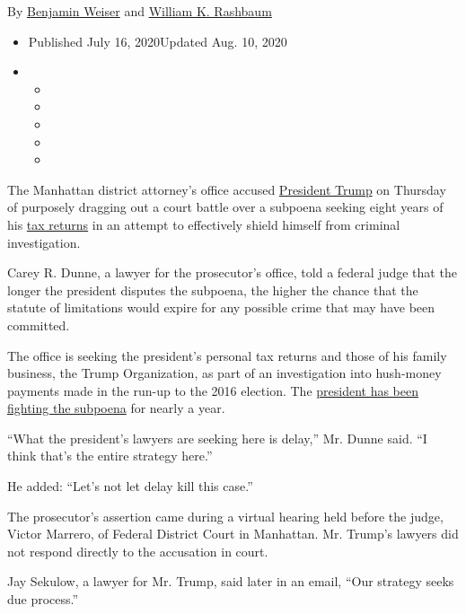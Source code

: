 By \href{https://www.nytimes3xbfgragh.onion/by/benjamin-weiser}{Benjamin
Weiser} and
\href{https://www.nytimes3xbfgragh.onion/by/william-k-rashbaum}{William
K. Rashbaum}

\begin{itemize}
\item
  Published July 16, 2020Updated Aug. 10, 2020
\item
  \begin{itemize}
  \item
  \item
  \item
  \item
  \item
  \end{itemize}
\end{itemize}

The Manhattan district attorney's office accused
\href{https://www.nytimes3xbfgragh.onion/2020/08/05/nyregion/trump-taxes-vance-deutsche-bank.html}{President
Trump} on Thursday of purposely dragging out a court battle over a
subpoena seeking eight years of his
\href{https://www.nytimes3xbfgragh.onion/2020/08/20/nyregion/donald-trump-taxes-cyrus-vance.html}{tax
returns} in an attempt to effectively shield himself from criminal
investigation.

Carey R. Dunne, a lawyer for the prosecutor's office, told a federal
judge that the longer the president disputes the subpoena, the higher
the chance that the statute of limitations would expire for any possible
crime that may have been committed.

The office is seeking the president's personal tax returns and those of
his family business, the Trump Organization, as part of an investigation
into hush-money payments made in the run-up to the 2016 election. The
\href{https://www.nytimes3xbfgragh.onion/2020/07/09/us/politics/trump-taxes.html}{president
has been fighting the subpoena} for nearly a year.

``What the president's lawyers are seeking here is delay,'' Mr. Dunne
said. ``I think that's the entire strategy here.''

He added: ``Let's not let delay kill this case.''

The prosecutor's assertion came during a virtual hearing held before the
judge, Victor Marrero, of Federal District Court in Manhattan. Mr.
Trump's lawyers did not respond directly to the accusation in court.

Jay Sekulow, a lawyer for Mr. Trump, said later in an email, ``Our
strategy seeks due process.''

